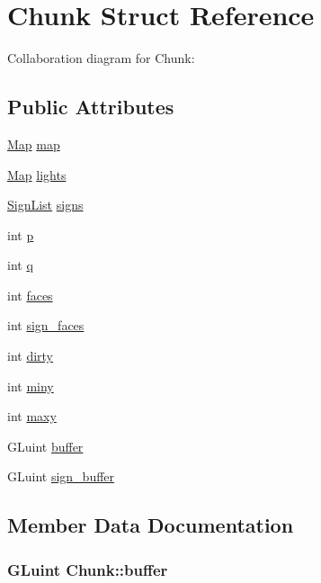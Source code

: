 \hypertarget{structChunk}{}\section{Chunk Struct Reference}
\label{structChunk}


Collaboration diagram for Chunk\+:
\subsection*{Public Attributes}
\begin{DoxyCompactItemize}
\item 
\hyperlink{structMap}{Map} \hyperlink{structChunk_ac925ff5f92406dea6f56044d7e1e2089}{map}
\item 
\hyperlink{structMap}{Map} \hyperlink{structChunk_a5c3da6f37c20d1a9e4a6b128d9b4cfc2}{lights}
\item 
\hyperlink{structSignList}{Sign\+List} \hyperlink{structChunk_acd18dcf6bf17f499e36b5806519d8800}{signs}
\item 
int \hyperlink{structChunk_a016383084b50c856a1fb63f97ca63dc6}{p}
\item 
int \hyperlink{structChunk_a20fb30e8ac307726320ef6d3e4cd89a1}{q}
\item 
int \hyperlink{structChunk_aed1e3841c79fac84de3514739ca0ff0e}{faces}
\item 
int \hyperlink{structChunk_a6ffdf89c012dfaefe531aa0eb93fe69a}{sign\+\_\+faces}
\item 
int \hyperlink{structChunk_a67d8b303bbdb6b9928fec2783d08f59f}{dirty}
\item 
int \hyperlink{structChunk_a528c51d2899b3f2d2c1fa8d7ef90621a}{miny}
\item 
int \hyperlink{structChunk_a3745b0b938e79f1ee64eff354994994e}{maxy}
\item 
G\+Luint \hyperlink{structChunk_a37268084ae967da79d9e47033fcfd259}{buffer}
\item 
G\+Luint \hyperlink{structChunk_a7c89d7fc29dbdd94c50280e92def013c}{sign\+\_\+buffer}
\end{DoxyCompactItemize}


\subsection{Member Data Documentation}
\subsubsection[{\texorpdfstring{buffer}{buffer}}]{\setlength{\rightskip}{0pt plus 5cm}G\+Luint Chunk\+::buffer}\hypertarget{structChunk_a37268084ae967da79d9e47033fcfd259}{}\label{structChunk_a37268084ae967da79d9e47033fcfd259}
